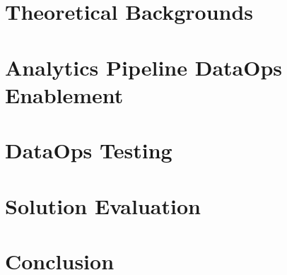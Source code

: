 	\chapter{Theoretical Backgrounds}
		
		\label{chap:theoretical-backgrounds}

	\chapter{Analytics Pipeline DataOps Enablement}
		
		\label{chap:dataops-enablement}

	\chapter{DataOps Testing}
		
		\label{chap:dataops-testing}

	\chapter{Solution Evaluation}
		
		\label{chap:solution-evaluation}
	
	\chapter{Conclusion}
		
		\label{chap:conclusion}
		
		

	\pagestyle{plain}
	\clearpage
	\printbibliography
